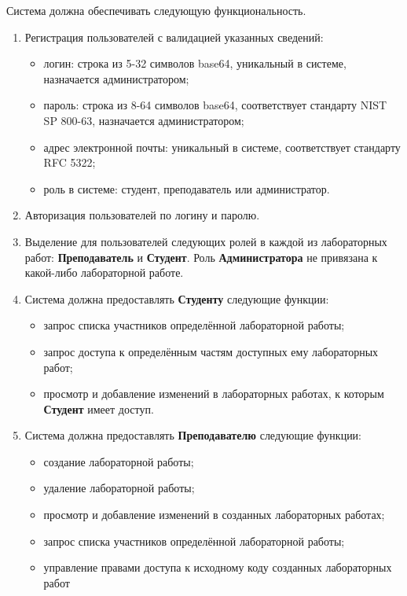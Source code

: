\documentclass{bmstu}
\begin{document}
  Система должна обеспечивать следующую функциональность.
  \begin{enumerate}[label*=\arabic*.]
    \item Регистрация пользователей с валидацией указанных
      сведений:
      \begin{itemize}[label=---]
        \item логин: строка из 5-32 символов base64, уникальный в системе, назначается администратором;
        \item пароль: строка из 8-64 символов base64, соответствует стандарту NIST SP 800-63, назначается администратором;
        \item адрес электронной почты: уникальный в системе, соответствует стандарту RFC 5322;
        \item роль в системе: студент, преподаватель или администратор.
      \end{itemize}
    \item Авторизация пользователей по логину и паролю.
    \item Выделение для пользователей следующих ролей в каждой из лабораторных работ:
      \textbf{Преподаватель} и \textbf{Студент}.
      Роль \textbf{Администратора} не привязана к какой-либо лабораторной работе.
    \item Система должна предоставлять \textbf{Студенту} следующие функции:
    \begin{itemize}[label=---]
    	\item запрос списка участников определённой лабораторной работы;
    	\item запрос доступа к определённым частям доступных ему лабораторных работ;
    	\item просмотр и добавление изменений в лабораторных работах, к которым
    	  \textbf{Студент} имеет доступ.
    \end{itemize}
    \item Система должна предоставлять \textbf{Преподавателю} следующие
      функции:
    \begin{itemize}[label=---]
    	\item создание лабораторной работы;
    	\item удаление лабораторной работы;
    	\item просмотр и добавление изменений в созданных лабораторных работах;
    	\item запрос списка участников определённой лабораторной работы;
    	\item управление правами доступа к исходному коду созданных лабораторных работ

\end{itemize}
\end{enumerate}
\end{document}
